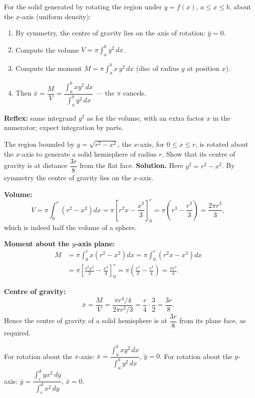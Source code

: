 \documentclass[11pt]{article}
\begin{document}
\begin{methode}
For the solid generated by rotating the region under $y=f(x)$, $a\leq x\leq b$, about the $x$-axis (uniform density):
\begin{enumerate}
\item By symmetry, the centre of gravity lies on the axis of rotation: $\bar y = 0$.
\item Compute the volume $V=\pi\displaystyle\int_a^b y^2\,dx$.
\item Compute the moment $M=\pi\displaystyle\int_a^b x\,y^2\,dx$ (disc of radius $y$ at position $x$).
\item Then $\bar{x}=\dfrac{M}{V}=\dfrac{\displaystyle\int_a^b x y^2\,dx}{\displaystyle\int_a^b y^2\,dx}$ — the $\pi$ cancels.
\end{enumerate}
\textbf{Reflex:} same integrand $y^2$ as for the volume, with an extra factor $x$ in the numerator; expect integration by parts.
\end{methode}

\begin{exoresolu}
The region bounded by $y=\sqrt{r^2-x^2}$, the $x$-axis, for $0\leq x\leq r$, is rotated about the $x$-axis to generate a solid hemisphere of radius $r$. Show that its centre of gravity is at distance $\dfrac{3r}{8}$ from the flat face.
\tcblower
\textbf{Solution.} Here $y^2=r^2-x^2$. By symmetry the centre of gravity lies on the $x$-axis.

\textbf{Volume:}
\[ V=\pi\int_0^r\left(r^2-x^2\right)dx=\pi\left[r^2x-\frac{x^3}{3}\right]_0^r
=\pi\left(r^3-\frac{r^3}{3}\right)=\frac{2\pi r^3}{3}, \]
which is indeed half the volume of a sphere.

\textbf{Moment about the $y$-axis plane:}
\begin{align*}
M&=\pi\int_0^r x\left(r^2-x^2\right)dx=\pi\int_0^r\left(r^2x-x^3\right)dx\\
&=\pi\left[\frac{r^2x^2}{2}-\frac{x^4}{4}\right]_0^r
=\pi\left(\frac{r^4}{2}-\frac{r^4}{4}\right)=\frac{\pi r^4}{4}.
\end{align*}

\textbf{Centre of gravity:}
\[ \bar{x}=\frac{M}{V}=\frac{\pi r^4/4}{2\pi r^3/3}=\frac{r}{4}\cdot\frac{3}{2}=\frac{3r}{8}. \]
Hence the centre of gravity of a solid hemisphere is at $\dfrac{3r}{8}$ from its plane face, as required.
\end{exoresolu}

\begin{aretenir}
For rotation about the $x$-axis: $\bar{x} = \dfrac{\int_a^b x y^2\,dx}{\int_a^b y^2\,dx}$, $\bar{y}=0$.
For rotation about the $y$-axis: $\bar{y} = \dfrac{\int_c^d y x^2\,dy}{\int_c^d x^2\,dy}$, $\bar{x}=0$.
\end{aretenir}
\end{document}
